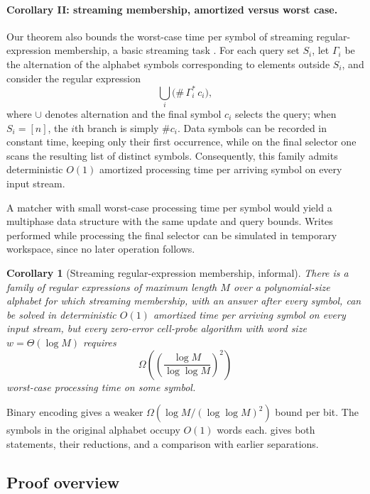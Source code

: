 \documentclass[11pt]{article}
\theoremstyle{plain}
\newtheorem{corollary}[theorem]{Corollary}
\theoremstyle{definition}
\theoremstyle{remark}
\begin{document}
\paragraph{Corollary II: streaming membership, amortized versus worst case.}
Our theorem also bounds the worst-case time per symbol of streaming regular-expression membership, a basic streaming task \cite{bille_regular_2010,naor_streaming_2022}. For each query set $S_i$, let $\Gamma_i$ be the alternation of the alphabet symbols corresponding to elements outside $S_i$, and consider the regular expression
\[
\bigcup_i \big(\#\, \Gamma_i^*\, c_i\big),
\]
where $\cup$ denotes alternation and the final symbol $c_i$ selects the query; when $S_i=[n]$, the $i$th branch is simply $\#c_i$. Data symbols can be recorded in constant time, keeping only their first occurrence, while on the final selector one scans the resulting list of distinct symbols. Consequently, this family admits deterministic $O(1)$ amortized processing time per arriving symbol on every input stream.

A matcher with small worst-case processing time per symbol would yield a multiphase data structure with the same update and query bounds. Writes performed while processing the final selector can be simulated in temporary workspace, since no later operation follows.

\begin{corollary}[Streaming regular-expression membership, informal]\label{thm:streaming-regex-informal}
There is a family of regular expressions of maximum length $M$ over a polynomial-size alphabet for which streaming membership, with an answer after every symbol, can be solved in deterministic $O(1)$ amortized time per arriving symbol on every input stream, but every zero-error cell-probe algorithm with word size $w=\Theta(\log M)$ requires
\[
\Omega\!\left(\left(\frac{\log M}{\log\log M}\right)^2\right)
\]
worst-case processing time on some symbol.
\end{corollary}

\noindent Binary encoding gives a weaker $\Omega(\log M/(\log\log M)^2)$ bound per bit. The symbols in the original alphabet occupy $O(1)$ words each.  gives both statements, their reductions, and a comparison with earlier separations.

\subsection{Proof overview}\label{sec:overview}
\end{document}
